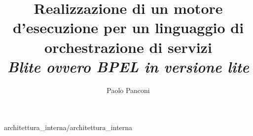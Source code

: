 \documentclass[a4paper,12pt,twoside]{book}
\begin{document}
\hyphenation{}
\sloppy

\title{\textsf{ \textbf{Realizzazione di un motore d'esecuzione per un
linguaggio di orchestrazione di servizi} \\ 
\em \large Blite ovvero BPEL in versione lite}\\ } 
\author{Paolo Panconi}

\maketitle


\tableofcontents

\listoffigures

%
%


%
{architettura_interna/architettura_interna}
\end{document}
